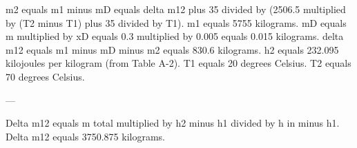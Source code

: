 m2 equals m1 minus mD equals delta m12 plus 35 divided by (2506.5 multiplied by (T2 minus T1) plus 35 divided by T1).  
m1 equals 5755 kilograms.  
mD equals m multiplied by xD equals 0.3 multiplied by 0.005 equals 0.015 kilograms.  
delta m12 equals m1 minus mD minus m2 equals 830.6 kilograms.  
h2 equals 232.095 kilojoules per kilogram (from Table A-2).  
T1 equals 20 degrees Celsius.  
T2 equals 70 degrees Celsius.  

---

Delta m12 equals m total multiplied by h2 minus h1 divided by h in minus h1.  
Delta m12 equals 3750.875 kilograms.